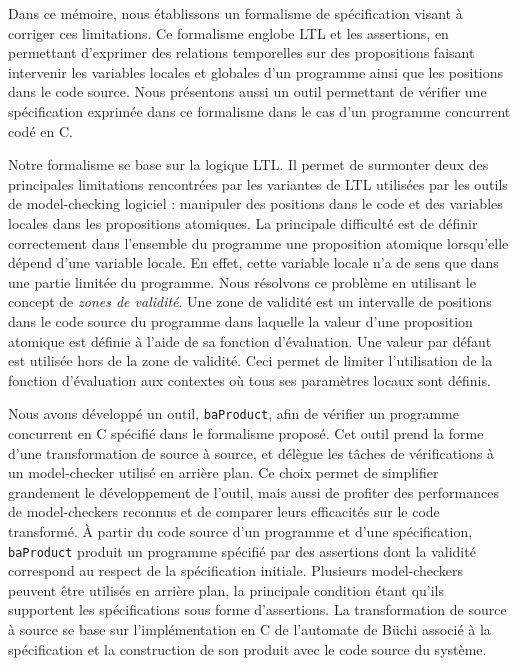 Dans ce mémoire, nous établissons un formalisme de spécification visant à
corriger ces limitations. Ce formalisme englobe LTL et les assertions, en
permettant d'exprimer des relations temporelles sur des propositions faisant
intervenir les variables locales et globales d'un programme ainsi que les
positions dans le code source. Nous présentons aussi un outil permettant de
vérifier une spécification exprimée dans ce formalisme dans le cas d'un
programme concurrent codé en C.

Notre formalisme se base sur la logique LTL. Il permet de surmonter deux des
principales limitations rencontrées par les variantes de LTL utilisées par les
outils de model-checking logiciel : manipuler des positions dans le code et des
variables locales dans les propositions atomiques. La principale difficulté est
de définir correctement dans l'ensemble du programme une proposition atomique
lorsqu'elle dépend d'une variable locale. En effet, cette variable locale n'a de
sens que dans une partie limitée du programme. Nous résolvons ce problème en
utilisant le concept de \emph{zones de validité}. Une zone de validité est un
intervalle de positions dans le code source du programme dans laquelle la valeur
d'une proposition atomique est définie à l'aide de sa fonction d'évaluation.
Une valeur par défaut est utilisée hors de la zone de validité. Ceci permet de
limiter l'utilisation de la fonction d'évaluation aux contextes où tous ses
paramètres locaux sont définis.

Nous avons développé un outil, \texttt{baProduct}, afin de vérifier un programme
concurrent en C spécifié dans le formalisme proposé. Cet outil prend la forme d'une
transformation de source à source, et délègue les tâches de vérifications à un
model-checker utilisé en arrière plan. Ce choix permet de simplifier grandement
le développement de l'outil, mais aussi de profiter des performances de
model-checkers reconnus et de comparer leurs efficacités sur le code transformé.
À partir du code source d'un
programme et d'une spécification, \texttt{baProduct} produit un programme
spécifié par des assertions dont la validité correspond au respect de la
spécification initiale. Plusieurs model-checkers peuvent être utilisés en
arrière plan, la principale condition étant qu'ils supportent les spécifications
sous forme d'assertions. La transformation de source à source se base sur
l'implémentation en C de l'automate de Büchi associé à la spécification et la
construction de son produit avec le code source du système.

